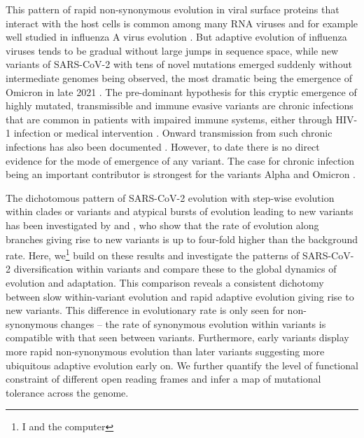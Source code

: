 \documentclass[aps,rmp, twocolumn]{revtex4}
\begin{document}
This pattern of rapid non-synonymous evolution in viral surface proteins that interact with the host cells is common among many RNA viruses and for example well studied in influenza A virus evolution \citep{bhatt_genomic_2011,strelkowa_clonal_2012}.
But adaptive evolution of influenza viruses tends to be gradual without large jumps in sequence space, while new variants of SARS-CoV-2 with tens of novel mutations emerged suddenly without intermediate genomes being observed, the most dramatic being the emergence of Omicron in late 2021 \citep{viana_rapid_2022}.
The pre-dominant hypothesis for this cryptic emergence of highly mutated, transmissible and immune evasive variants are chronic infections that are common in patients with impaired immune systems, either through HIV-1 infection \citep{cele_sars-cov-2_2022} or medical intervention \citep{choi_persistence_2020,kemp_sars-cov-2_2021}.
Onward transmission from such chronic infections has also been documented \citep{gonzalez-reiche_intrahost_2022}.
However, to date there is no direct evidence for the mode of emergence of any variant.
The case for chronic infection being an important contributor is strongest for the variants Alpha and Omicron \citep{hill_origins_2022}.

The dichotomous pattern of SARS-CoV-2 evolution with step-wise evolution within clades or variants and atypical bursts of evolution leading to new variants has been investigated by \citet{tay_emergence_2022} and \citet{hill_origins_2022}, who show that the rate of evolution along branches giving rise to new variants is up to four-fold higher than the background rate.
Here, we\footnote[1]{I and the computer} build on these results and investigate the patterns of SARS-CoV-2 diversification within variants and compare these to the global dynamics of evolution and adaptation.
This comparison reveals a consistent dichotomy between slow within-variant evolution and rapid adaptive evolution giving rise to new variants.
This difference in evolutionary rate is only seen for non-synonymous changes -- the rate of synonymous evolution within variants is compatible with that seen between variants.
Furthermore, early variants display more rapid non-synonymous evolution than later variants suggesting more ubiquitous adaptive evolution early on.
We further quantify the level of functional constraint of different open reading frames and infer a map of mutational tolerance across the genome.
\end{document}
